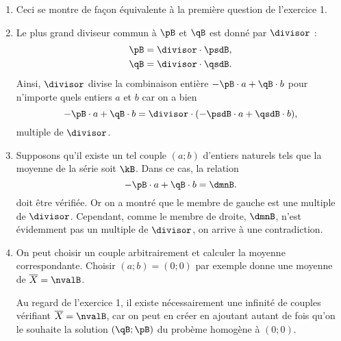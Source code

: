 {
	\begin{enumerate}
		\item
			Ceci se montre de façon équivalente à la première question de l'exercice 1.
		\item
			Le plus grand diviseur commun à $\pB$ et $\qB$ est donné par $\divisor$ :
				\begin{align*}
					\pB &= \divisor \cdot \psdB, \\
					\qB &= \divisor \cdot \qsdB.
				\end{align*}
			Ainsi, $\divisor$ divise la combinaison entière $ - \pB \cdot a + \qB \cdot b$ pour n'importe quels entiers $a$ et $b$ car on a bien
				\[ - \pB \cdot a + \qB \cdot b = \divisor \cdot ( - \psdB \cdot a + \qsdB \cdot b ), \]
			multiple de $\divisor$.
		\item
		Supposons qu'il existe un tel couple $(a;b)$ d'entiers naturels tels que la moyenne de la série soit $\kB$.
		Dans ce cas, la relation 
			\[ - \pB \cdot a + \qB \cdot b = \dmnB. \]
		doit être vérifiée.
		Or on a montré que le membre de gauche est une multiple de $\divisor$.
		Cependant, comme le membre de droite, $\dmnB$, n'est évidemment pas un multiple de $\divisor$, on arrive à une contradiction.
		\item 
		On peut choisir un couple arbitrairement et calculer la moyenne correspondante.
		Choisir $(a;b) = (0;0)$ par exemple donne une moyenne de $\overline{X} = \nvalB$.
		
		Au regard de l'exercice 1, il existe nécessairement une infinité de couples vérifiant $\overline{X} = \nvalB$, car on peut en créer en ajoutant autant de fois qu'on le souhaite la solution $(\qB ; \pB)$ du probème homogène à $(0;0)$.
	\end{enumerate}

}

